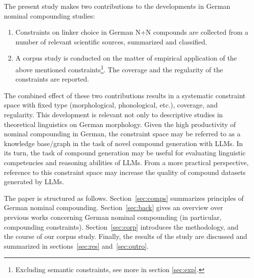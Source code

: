 \documentclass[10pt, a4paper]{article}
\begin{document}
The present study makes two contributions to the developments in German nominal compounding studies:

\begin{enumerate}
    
    \item Constraints on linker choice in German N+N compounds are collected from a number of relevant scientific sources, summarized and classified.

    \item A corpus study is conducted on the matter of empirical application of the above mentioned constraints\footnote{Excluding semantic constraints, see more in section \ref{sec:exp}.}. The coverage and the regularity of the constraints are reported.
    
\end{enumerate}

The combined effect of these two contributions results in a systematic constraint space with fixed type (morphological, phonological, etc.), coverage, and regularity. This development is relevant not only to descriptive studies in theoretical linguistics on German morphology. Given the high productivity of nominal compounding in German, the constraint space may be referred to as a knowledge base/graph in the task of novel compound generation with LLMs. In its turn, the task of compound generation may be useful for evaluating linguistic competencies and reasoning abilities of LLMs. From a more practical perspective, reference to this constraint space may increase the quality of compound datasets generated by LLMs.

The paper is structured as follows. Section~\ref{sec:comps} summarizes principles of German nominal compounding. Section~\ref{sec:back} gives an overview over previous works concerning German nominal compounding (in particular, compounding constraints). Section~\ref{sec:corp} introduces the methodology, and the course of our corpus study. Finally, the results of the study are discussed and summarized in sections~\ref{sec:res} and~\ref{sec:outro}.
\end{document}
